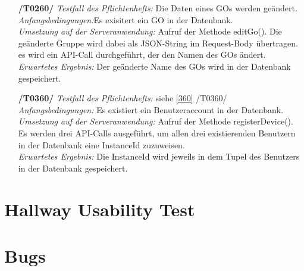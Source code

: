 \documentclass[11pt,a4paper]{scrartcl}
\begin{document}
\begin{enumerate}
	\item[\textbf{/T0260/}]
	\textit{Testfall des Pflichtenhefts: }Die Daten eines GOs werden geändert.\\
	\textit{Anfangsbedingungen:}Es exisitert ein GO in der Datenbank.\\
	\textit{Umsetzung auf der Serveranwendung: }Aufruf der Methode editGo(). Die geänderte Gruppe wird dabei als JSON-String im Request-Body übertragen. es wird ein API-Call durchgeführt, der den Namen des GOs ändert.\\
	\textit{Erwartetes Ergebnis: }Der geänderte Name des GOs wird in der Datenbank gespeichert.
	
	\item[\textbf{/T0360/}]
	\textit{Testfall des Pflichtenhefts: }siehe \ref{360} /T0360/\\
	\textit{Anfangsbedingungen:} Es existiert ein Benutzeraccount in der Datenbank.\\
	\textit{Umsetzung auf der Serveranwendung: }Aufruf der Methode registerDevice(). Es werden drei API-Calls ausgeführt, um allen drei existierenden Benutzern in der Datenbank eine InstanceId zuzuweisen.\\
	\textit{Erwartetes Ergebnis: }Die InstanceId wird jeweils in dem Tupel des Benutzers in der Datenbank gespeichert.
	
\end{enumerate}

\newpage

\section{Hallway Usability Test}

\newpage

\section{Bugs}
\end{document}

